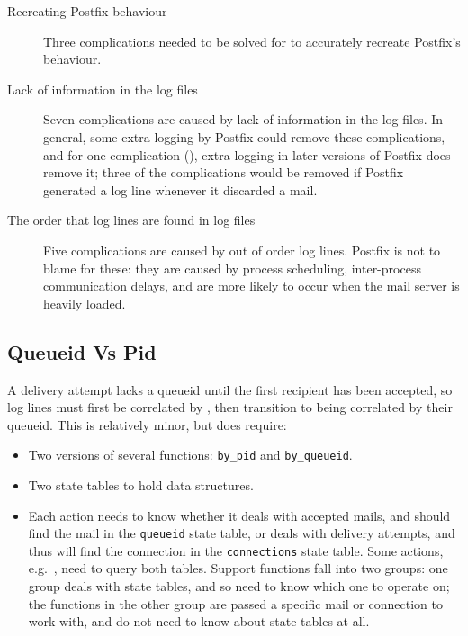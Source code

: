 \begin{description}

    \item [Recreating Postfix behaviour] Three complications needed to be
        solved for \parsername{} to accurately recreate Postfix's
        behaviour.

    \item [Lack of information in the log files] Seven complications are
        caused by lack of information in the log files.  In general, some
        extra logging by Postfix could remove these complications, and for
        one complication (),
        extra logging in later versions of Postfix does remove it; three of
        the complications would be removed if Postfix generated a log line
        whenever it discarded a mail.

    \item [The order that log lines are found in log files] Five
        complications are caused by out of order log lines.  Postfix is not
        to blame for these: they are caused by process scheduling,
        inter-process communication delays, and are more likely to occur
        when the mail server is heavily loaded.

\end{description}

\subsection{Queueid Vs Pid}

\label{queueid vs pid}

A delivery attempt lacks a queueid until the first recipient has been
accepted, so log lines must first be correlated by 
, then transition to being correlated by their queueid.  This
is relatively minor, but does require:

\begin{itemize}

    \squeezeitems{}

    \item Two versions of several functions: \texttt{by\_pid} and
        \texttt{by\_queueid}.

    \item Two state tables to hold data structures.

    \item Each action needs to know whether it deals with accepted mails,
        and should find the mail in the \texttt{queueid} state table, or
        deals with delivery attempts, and thus will find the connection in
        the \texttt{connections} state table.  Some actions, e.g.\
        , need to query both tables.  Support
        functions fall into two groups: one group deals with state tables,
        and so need to know which one to operate on; the functions in the
        other group are passed a specific mail or connection to work with,
        and do not need to know about state tables at all.

\end{itemize}

